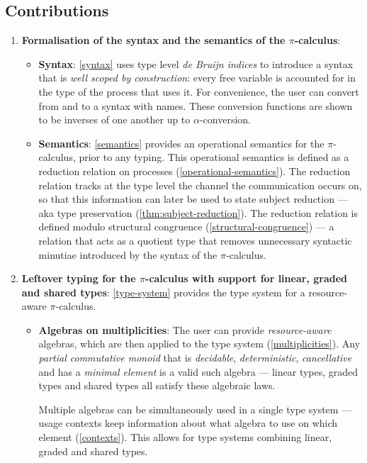 \documentclass[sigplan,10pt,anonymous,review]{acmart}
\theoremstyle{definition}
\newcommand{\picalc}{$\pi$-calculus}
\begin{document}
\subsection{Contributions}
\begin{enumerate}
\item \textbf{Formalisation of the syntax and the semantics of the \picalc{}}:
 \begin{itemize}
   \item \textbf{Syntax}: \autoref{syntax} uses type level \emph{de Bruijn indices} \cite{deBruijn1972, Dybjer1994} to introduce a syntax that is \emph{well scoped by construction}: every free variable is accounted for in the type of the process that uses it.
     For convenience, the user can convert from and to a syntax with names.
     These conversion functions are shown to be inverses of one another up to $\alpha$-conversion.
   
   \item \textbf{Semantics}: \autoref{semantics} provides an operational semantics for the \picalc{}, prior to any typing.
   This operational semantics is defined as a reduction relation on processes (\autoref{operational-semantics}).
   The reduction relation tracks at the type level the channel the communication occurs on, so that this information can later be used to state subject reduction --- aka type preservation (\autoref{thm:subject-reduction}).
   The reduction relation is defined modulo structural congruence (\autoref{structural-congruence}) --- a relation that acts as a quotient type that removes unnecessary syntactic minutiae introduced by the syntax of the \picalc{}.
 \end{itemize}
  
  \item \textbf{Leftover typing for the \picalc{} with support for linear, graded and shared types}:
  \autoref{type-system} provides the type system for a resource-aware \picalc{}.
  \begin{itemize}
    \item \textbf{Algebras on multiplicities}: The user can provide \emph{resource-aware} algebras, which are then applied to the type system (\autoref{multiplicities}).
    Any \emph{partial commutative monoid} that is \emph{decidable}, \emph{deterministic}, \emph{cancellative} and has a \emph{minimal element} is a valid such algebra --- linear types, graded types and shared types all satisfy these algebraic laws.

    Multiple algebras can be simultaneously used in a single type system --- usage contexts keep information about what algebra to use on which element (\autoref{contexts}).
    This allows for type systems combining linear, graded and shared types.
    

\end{itemize}
\end{enumerate}
\end{document}

